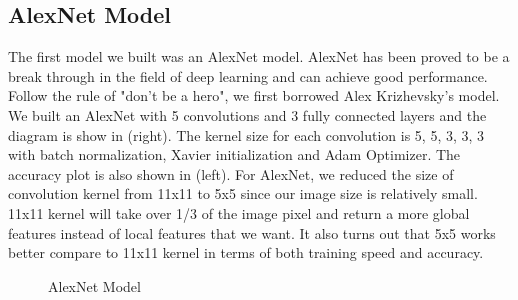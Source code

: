 \documentclass{article} %
\begin{document}
\subsection{AlexNet Model}
The first model we built was an AlexNet model. AlexNet has been proved to be a break through in the
field of deep learning and can achieve good performance. Follow the rule of "don't be a hero", we
first borrowed Alex Krizhevsky's model. We built an AlexNet with 5 convolutions and 3 fully connected
 layers and the diagram is show in  (right). The kernel size for each convolution 
 is 5, 5, 3, 3, 3 with batch normalization, Xavier initialization and Adam Optimizer. The accuracy 
 plot is also shown in  (left). For AlexNet, we reduced the size of convolution kernel 
 from 11x11 to 5x5 since our image size is relatively small. 11x11 kernel will take over 1/3 of the 
 image pixel and return a more global features instead of local features that we want. It also turns 
 out that 5x5 works better compare to 11x11 kernel in terms of both training speed and accuracy.

\begin{figure}[h]
    \centering
    \qquad
    \caption{AlexNet Model}
    \label{fig:alex}
\end{figure}
 
\end{document}
